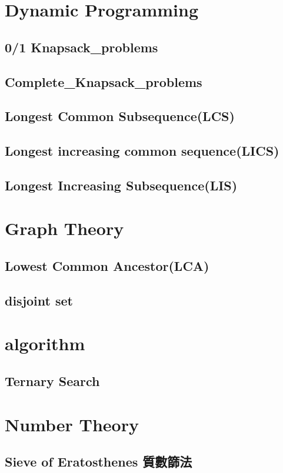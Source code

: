 \section{Dynamic Programming}
    \subsection{0/1 Knapsack\_problems}
        
    \subsection{Complete\_Knapsack\_problems}
        
    \subsection{Longest Common Subsequence(LCS)}
        
    \subsection{Longest increasing common sequence(LICS)}
        
    \subsection{Longest Increasing Subsequence(LIS)}
        
\section{Graph Theory}
    \subsection{Lowest Common Ancestor(LCA)}
        
    \subsection{disjoint set}
        
\section{algorithm}
    \subsection{Ternary Search}
        
\section{Number Theory}
    \subsection{Sieve of Eratosthenes 質數篩法}
        